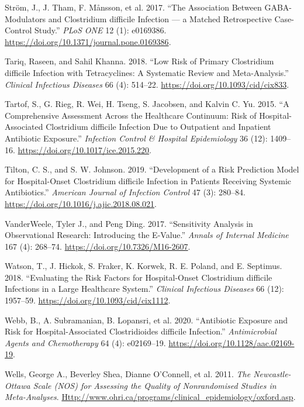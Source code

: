 \documentclass[
  letterpaper,
  DIV=11,
  numbers=noendperiod]{scrartcl}
\newlength{\cslhangindent}
\newenvironment{CSLReferences}[2] %
 {\begin{list}{}{%
  \setlength{\itemindent}{0pt}
  \setlength{\leftmargin}{0pt}
  \setlength{\parsep}{0pt}
  \ifodd #1
   \setlength{\leftmargin}{\cslhangindent}
   \setlength{\itemindent}{-1\cslhangindent}
  \fi
  \setlength{\itemsep}{#2\baselineskip}}}
 {\end{list}}
\begin{document}
\begin{CSLReferences}{1}{1}
Ström, J., J. Tham, F. Månsson, et al. 2017. {``The Association Between
{GABA}-Modulators and {Clostridium difficile} Infection --- a Matched
Retrospective Case-Control Study.''} \emph{PLoS ONE} 12 (1): e0169386.
\url{https://doi.org/10.1371/journal.pone.0169386}.

Tariq, Raseen, and Sahil Khanna. 2018. {``Low Risk of Primary
{Clostridium difficile} Infection with Tetracyclines: A Systematic
Review and Meta-Analysis.''} \emph{Clinical Infectious Diseases} 66 (4):
514--22. \url{https://doi.org/10.1093/cid/cix833}.

Tartof, S., G. Rieg, R. Wei, H. Tseng, S. Jacobsen, and Kalvin C. Yu.
2015. {``A Comprehensive Assessment Across the Healthcare Continuum:
Risk of Hospital-Associated {Clostridium difficile} Infection Due to
Outpatient and Inpatient Antibiotic Exposure.''} \emph{Infection Control
\& Hospital Epidemiology} 36 (12): 1409--16.
\url{https://doi.org/10.1017/ice.2015.220}.

Tilton, C. S., and S. W. Johnson. 2019. {``Development of a Risk
Prediction Model for Hospital-Onset {Clostridium difficile} Infection in
Patients Receiving Systemic Antibiotics.''} \emph{American Journal of
Infection Control} 47 (3): 280--84.
\url{https://doi.org/10.1016/j.ajic.2018.08.021}.

VanderWeele, Tyler J., and Peng Ding. 2017. {``Sensitivity Analysis in
Observational Research: Introducing the {E-Value}.''} \emph{Annals of
Internal Medicine} 167 (4): 268--74.
\url{https://doi.org/10.7326/M16-2607}.

Watson, T., J. Hickok, S. Fraker, K. Korwek, R. E. Poland, and E.
Septimus. 2018. {``Evaluating the Risk Factors for Hospital-Onset
{Clostridium difficile} Infections in a Large Healthcare System.''}
\emph{Clinical Infectious Diseases} 66 (12): 1957--59.
\url{https://doi.org/10.1093/cid/cix1112}.

Webb, B., A. Subramanian, B. Lopansri, et al. 2020. {``Antibiotic
Exposure and Risk for Hospital-Associated {Clostridioides difficile}
Infection.''} \emph{Antimicrobial Agents and Chemotherapy} 64 (4):
e02169--19. \url{https://doi.org/10.1128/aac.02169-19}.

Wells, George A., Beverley Shea, Dianne O'Connell, et al. 2011.
\emph{The {Newcastle-Ottawa Scale} ({NOS}) for Assessing the Quality of
Nonrandomised Studies in Meta-Analyses}.
\href{http://www.ohri.ca/programs/clinical_epidemiology/oxford.asp}{Http://www.ohri.ca/programs/clinical\_epidemiology/oxford.asp}.


\end{CSLReferences}
\end{document}
